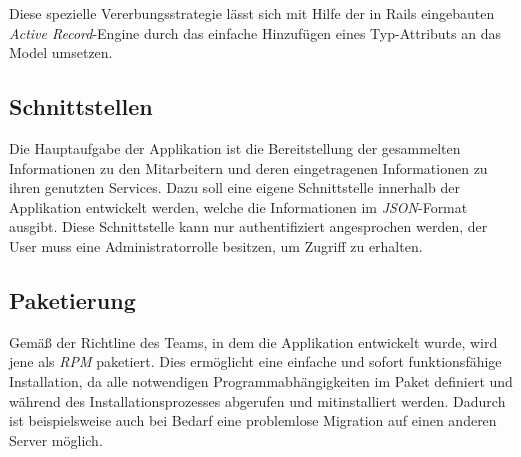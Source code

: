 
Diese spezielle Vererbungsstrategie lässt sich mit Hilfe der in Rails eingebauten
\textit{Active Record}-Engine durch das einfache Hinzufügen eines Typ-Attributs an das Model
umsetzen.

\subsection{Schnittstellen}
\label{sec:Schnittstellen}
Die Hauptaufgabe der Applikation ist die Bereitstellung der gesammelten Informationen zu den
Mitarbeitern und deren eingetragenen Informationen zu ihren genutzten Services. Dazu soll eine
eigene Schnittstelle innerhalb der Applikation entwickelt werden, welche die Informationen im
\textit{JSON}-Format ausgibt. Diese Schnittstelle kann nur authentifiziert angesprochen werden,
\dahe der User muss eine Administratorrolle besitzen, um Zugriff zu erhalten.


\subsection{Paketierung}
\label{sec:Paketierung}
Gemäß der Richtline des Teams, in dem die Applikation entwickelt wurde, wird jene als \textit{\acs{RPM}}
paketiert. Dies ermöglicht eine einfache und sofort funktionsfähige Installation, da alle
notwendigen Programmabhängigkeiten im Paket definiert und während des Installationsprozesses
abgerufen und mitinstalliert werden. Dadurch ist beispielsweise auch bei Bedarf eine problemlose
Migration auf einen anderen Server möglich.
